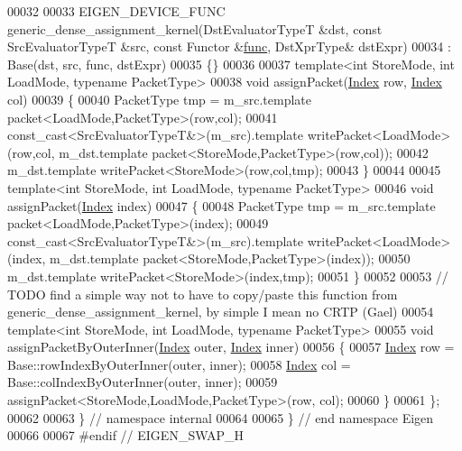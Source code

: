 \begin{DoxyCode}
00032   
00033   EIGEN\_DEVICE\_FUNC generic\_dense\_assignment\_kernel(DstEvaluatorTypeT &dst, \textcolor{keyword}{const} SrcEvaluatorTypeT &src, \textcolor{keyword}{
      const} Functor &\hyperlink{structfunc}{func}, DstXprType& dstExpr)
00034     : Base(dst, src, func, dstExpr)
00035   \{\}
00036   
00037   \textcolor{keyword}{template}<\textcolor{keywordtype}{int} StoreMode, \textcolor{keywordtype}{int} LoadMode, \textcolor{keyword}{typename} PacketType>
00038   \textcolor{keywordtype}{void} assignPacket(\hyperlink{namespace_eigen_a62e77e0933482dafde8fe197d9a2cfde}{Index} row, \hyperlink{namespace_eigen_a62e77e0933482dafde8fe197d9a2cfde}{Index} col)
00039   \{
00040     PacketType tmp = m\_src.template packet<LoadMode,PacketType>(row,col);
00041     \textcolor{keyword}{const\_cast<}SrcEvaluatorTypeT&\textcolor{keyword}{>}(m\_src).\textcolor{keyword}{template} writePacket<LoadMode>(row,col, m\_dst.template 
      packet<StoreMode,PacketType>(row,col));
00042     m\_dst.template writePacket<StoreMode>(row,col,tmp);
00043   \}
00044   
00045   \textcolor{keyword}{template}<\textcolor{keywordtype}{int} StoreMode, \textcolor{keywordtype}{int} LoadMode, \textcolor{keyword}{typename} PacketType>
00046   \textcolor{keywordtype}{void} assignPacket(\hyperlink{namespace_eigen_a62e77e0933482dafde8fe197d9a2cfde}{Index} index)
00047   \{
00048     PacketType tmp = m\_src.template packet<LoadMode,PacketType>(index);
00049     \textcolor{keyword}{const\_cast<}SrcEvaluatorTypeT&\textcolor{keyword}{>}(m\_src).\textcolor{keyword}{template} writePacket<LoadMode>(index, m\_dst.template 
      packet<StoreMode,PacketType>(index));
00050     m\_dst.template writePacket<StoreMode>(index,tmp);
00051   \}
00052   
00053   \textcolor{comment}{// TODO find a simple way not to have to copy/paste this function from generic\_dense\_assignment\_kernel,
       by simple I mean no CRTP (Gael)}
00054   \textcolor{keyword}{template}<\textcolor{keywordtype}{int} StoreMode, \textcolor{keywordtype}{int} LoadMode, \textcolor{keyword}{typename} PacketType>
00055   \textcolor{keywordtype}{void} assignPacketByOuterInner(\hyperlink{namespace_eigen_a62e77e0933482dafde8fe197d9a2cfde}{Index} outer, \hyperlink{namespace_eigen_a62e77e0933482dafde8fe197d9a2cfde}{Index} inner)
00056   \{
00057     \hyperlink{namespace_eigen_a62e77e0933482dafde8fe197d9a2cfde}{Index} row = Base::rowIndexByOuterInner(outer, inner); 
00058     \hyperlink{namespace_eigen_a62e77e0933482dafde8fe197d9a2cfde}{Index} col = Base::colIndexByOuterInner(outer, inner);
00059     assignPacket<StoreMode,LoadMode,PacketType>(row, col);
00060   \}
00061 \};
00062 
00063 \} \textcolor{comment}{// namespace internal}
00064 
00065 \} \textcolor{comment}{// end namespace Eigen}
00066 
00067 \textcolor{preprocessor}{#endif // EIGEN\_SWAP\_H}
\end{DoxyCode}
